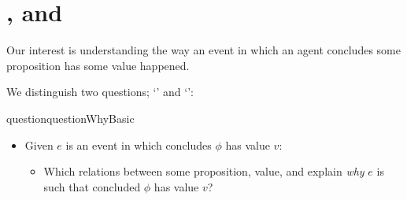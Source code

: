 \section*{\qWhy{}, \qHow{} and \issueInclusion{}}
\label{cha:intro:why-how}

\begin{note}
  Our interest is understanding the way an event in which an agent concludes some proposition has some value happened.

  We distinguish two questions; `\qWhy{}' and `\qHow{}':

  \begin{restatable}[\qWhy{}]{question}{questionWhyBasic}
    \label{q:why}
    \begin{itemize}
    \item
      Given \(e\) is an event in which \vAgent{} concludes \(\phi\) has value \(v\):
      \begin{itemize}
      \item
        Which relations between some proposition, value, and \pool{} explain \emph{why} \(e\) is such that \vAgent{} concluded \(\phi\) has value \(v\)?
      \end{itemize}
    \end{itemize}
    \vspace{-\baselineskip}
  \end{restatable}


\end{note}
